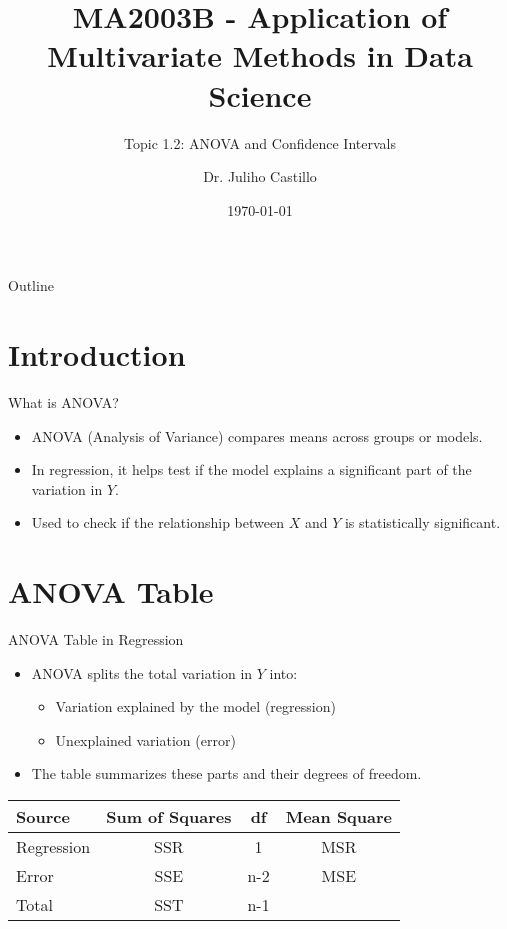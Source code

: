 \documentclass[aspectratio=169]{beamer}
\title[ANOVA \& Confidence Intervals]{MA2003B - Application of Multivariate Methods in Data Science}
\subtitle{Topic 1.2: ANOVA and Confidence Intervals}
\author{Dr. Juliho Castillo}
\institute{Tec de Monterrey}
\date{\today}
\begin{document}
\begin{frame}
  \titlepage
\end{frame}

\begin{frame}{Outline}
  \tableofcontents
\end{frame}

\section{Introduction}
\begin{frame}{What is ANOVA?}
  \begin{itemize}
    \item ANOVA (Analysis of Variance) compares means across groups or models.
    \item In regression, it helps test if the model explains a significant part of the variation in $Y$.
    \item Used to check if the relationship between $X$ and $Y$ is statistically significant.
  \end{itemize}
\end{frame}

\section{ANOVA Table}
\begin{frame}{ANOVA Table in Regression}
  \begin{itemize}
    \item ANOVA splits the total variation in $Y$ into:
    \begin{itemize}
      \item Variation explained by the model (regression)
      \item Unexplained variation (error)
    \end{itemize}
    \item The table summarizes these parts and their degrees of freedom.
  \end{itemize}
  \begin{center}
    \begin{tabular}{lccc}
      Source & Sum of Squares & df & Mean Square \\
      \hline
      Regression & SSR & 1 & MSR \\
      Error & SSE & n-2 & MSE \\
      Total & SST & n-1 & \\
    \end{tabular}
  \end{center}
\end{frame}
\end{document}
